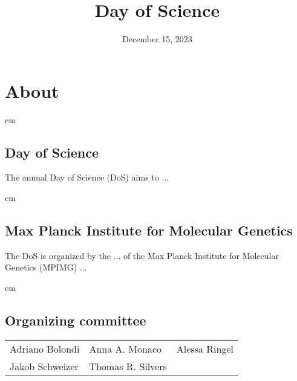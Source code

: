 \documentclass[10pt,a4paper]{scrreprt}
\begin{document}
\title{Day of Science}
\date{December 15, 2023}






\tableofcontents


\chapter{About}

 cm

\section*{Day of Science}

The annual Day of Science (DoS) aims to ...

 cm

\section*{Max Planck Institute for Molecular Genetics}

The DoS is organized by the ... of the Max Planck Institute for Molecular Genetics (MPIMG) ...

 cm

\section*{Organizing committee}

\begin{center}
	\begin{tabular}{l l l}
		Adriano Bolondi &  Anna A. Monaco &  Alessa Ringel\\
		Jakob Schweizer  &  Thomas R. Silvers &
	\end{tabular}
\end{center}
\end{document}
